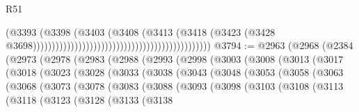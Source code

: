 \begin{lexlean}{R51}
\begin{coremodule}
                                                                                  (@3393
                                                                                    (@3398
                                                                                      (@3403
                                                                                        (@3408
                                                                                          (@3413
                                                                                            (@3418
                                                                                              (@3423
                                                                                                (@3428
                                                                                                  @3698)))))))))))))))))))))))))))))))))))))))))))))))
@3794 := @2963
    (@2968
      (@2384
        (@2973
          (@2978
            (@2983
              (@2988
                (@2993
                  (@2998
                    (@3003
                      (@3008
                        (@3013
                          (@3017
                            (@3018
                              (@3023
                                (@3028
                                  (@3033
                                    (@3038
                                      (@3043
                                        (@3048
                                          (@3053
                                            (@3058
                                              (@3063
                                                (@3068
                                                  (@3073
                                                    (@3078
                                                      (@3083
                                                        (@3088
                                                          (@3093
                                                            (@3098
                                                              (@3103
                                                                (@3108
                                                                  (@3113
                                                                    (@3118
                                                                      (@3123
                                                                        (@3128
                                                                          (@3133
                                                                            (@3138

\end{coremodule}
\end{lexlean}
